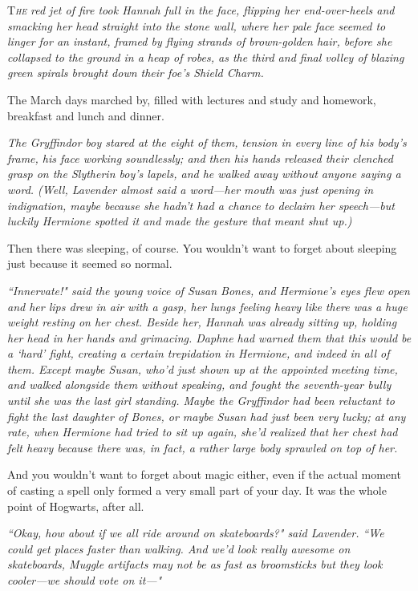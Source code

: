
\lettrine{T}{\emph{he}} \emph{red jet of fire took Hannah full in the face, flipping her end-over-heels and smacking her head straight into the stone wall, where her pale face seemed to linger for an instant, framed by flying strands of brown-golden hair, before she collapsed to the ground in a heap of robes, as the third and final volley of blazing green spirals brought down their foe's Shield Charm.}

The March days marched by, filled with lectures and study and homework, breakfast and lunch and dinner.

\emph{The Gryffindor boy stared at the eight of them, tension in every line of his body's frame, his face working soundlessly; and then his hands released their clenched grasp on the Slytherin boy's lapels, and he walked away without anyone saying a word. (Well, Lavender almost said a word—her mouth was just opening in indignation, maybe because she hadn't had a chance to declaim her speech—but luckily Hermione spotted it and made the gesture that meant \emph{shut up}.)}

Then there was sleeping, of course. You wouldn't want to forget about sleeping just because it seemed so normal.

\emph{``Innervate!" said the young voice of Susan Bones, and Hermione's eyes flew open and her lips drew in air with a gasp, her lungs feeling heavy like there was a huge weight resting on her chest. Beside her, Hannah was already sitting up, holding her head in her hands and grimacing. Daphne had warned them that this would be a `hard' fight, creating a certain trepidation in Hermione, and indeed in all of them. Except maybe Susan, who'd just shown up at the appointed meeting time, and walked alongside them without speaking, and fought the seventh-year bully until she was the last girl standing. Maybe the Gryffindor had been reluctant to fight the last daughter of Bones, or maybe Susan had just been very lucky; at any rate, when Hermione had tried to sit up again, she'd realized that her chest had felt heavy because there was, in fact, a rather large body sprawled on top of her.}

And you wouldn't want to forget about magic either, even if the actual moment of casting a spell only formed a very small part of your day. It was the whole point of Hogwarts, after all.

\emph{``Okay, how about if we all ride around on skateboards?" said Lavender. ``We could get places faster than walking. And we'd look really awesome on skateboards, Muggle artifacts may not be as fast as broomsticks but they look cooler—we should vote on it—"}

